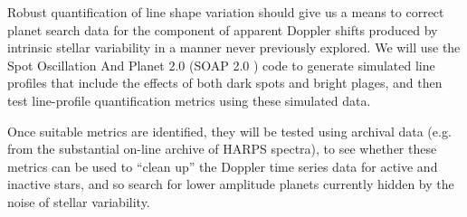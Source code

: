 \documentclass[a4paper]{article}
\begin{document}
Robust quantification of line shape variation should give us a means to correct planet search data for the component of apparent Doppler shifts produced by intrinsic stellar variability in a manner never previously explored. We will use the Spot Oscillation And Planet 2.0 (SOAP 2.0 \cite{Dumusque2014SOAP}) code to generate simulated line profiles that include the effects of both dark spots and bright plages, and then test line-profile quantification metrics using these simulated data.

Once suitable metrics are identified, they will be tested using archival data (e.g. from the substantial on-line archive of HARPS spectra), to see whether these metrics can be used to ``clean up'' the Doppler time series data for active and inactive stars, and so search for lower amplitude planets currently hidden by the noise of stellar variability.





















\end{document}
